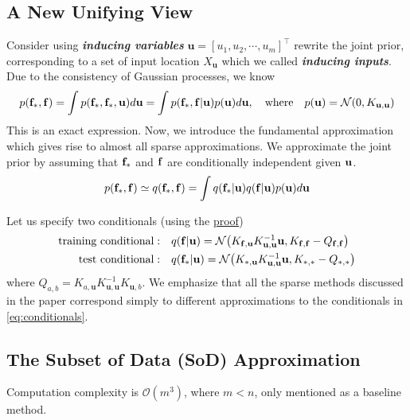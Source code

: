 \documentclass[10pt]{elegantbook}
\newcommand{\mydefination}[1]{\textbf{\textit{\textcolor{structurecolor}{#1}}}}
\begin{document}
\subsection{A New Unifying View}
Consider using \mydefination{inducing variables} $\mathbf u = [u_1, u_2, \cdots, u_m]^{\top}$ rewrite the joint prior, corresponding to a set of input 
location $X_{\mathbf u}$ which we called \mydefination{inducing inputs}. Due to the consistency of Gaussian processes, we know
\begin{equation}
    p({\bf f}_{*},{\bf f})=
    \int p({\bf f}_{*},{\bf f}_{*}, {\bf u}){d \mathbf u}=
    \int p({\bf f}_{*},{\bf f}|{\bf u})p({\bf u}){d \mathbf u},\quad\mathrm{where}\quad p({\bf u})={\mathcal N}(0,K_{\mathbf u,{\mathbf u}})
\end{equation}
This is an exact expression. Now, we introduce the fundamental approximation which gives rise
to almost all sparse approximations. We approximate the joint prior by assuming that ${\bf f}_{*}$ and $\bf f$ are
conditionally independent given $\bf u$.
\begin{equation}
    p({\bf f}_{*},{\bf f}) \simeq q({\bf f}_{*},{\bf f})=\int q({\bf f}_{*}|{\bf u})q({\bf f}|{\bf u})p({\bf u})d{\bf u}
\end{equation}

Let us specify two conditionals (using the \href{https://statproofbook.github.io/P/mvn-cond.html}{proof})
\begin{equation} \label{eq:conditionals}
\begin{aligned}
    \text{training conditional}: &\quad q({\bf f}|{\bf u}) = \mathcal N \big (K_{\mathbf f, \mathbf u} K_{\mathbf u, \mathbf u}^{-1} \mathbf u, 
    K_{\mathbf f, \mathbf f} - Q_{\mathbf f, \mathbf f} \big ) \\
    \text{test conditional}: &\quad q({\bf f}_*|{\bf u}) = \mathcal N \big (K_{*, \mathbf u} K_{\mathbf u, \mathbf u}^{-1} \mathbf u, 
    K_{*, *} - Q_{*, *} \big )
\end{aligned}
\end{equation}
where $Q_{a, b} = K_{a, \mathbf u} K_{\mathbf u, \mathbf u}^{-1} K_{\mathbf u, b}$.
We emphasize that all the sparse methods discussed in the paper correspond simply to different
approximations to the conditionals in \ref{eq:conditionals}.

\subsection{The Subset of Data (SoD) Approximation}
Computation complexity is $\mathcal O(m^3)$, where $m < n$, only mentioned as a baseline method.
\end{document}
